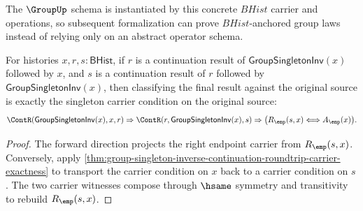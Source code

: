 The $\GroupUp$ schema is instantiated by this concrete $BHist$ carrier and
operations, so subsequent formalization can prove $BHist$-anchored group laws
instead of relying only on an abstract operator schema.

\begin{theorem}
\label{thm:group-singleton-inverse-continuation-roundtrip-source-iff}
For histories $x,r,s:\mathsf{BHist}$, if $r$ is a continuation result of
$\mathsf{GroupSingletonInv}(x)$ followed by $x$, and $s$ is a continuation
result of $r$ followed by $\mathsf{GroupSingletonInv}(x)$, then classifying the
final result against the original source is exactly the singleton carrier
condition on the original source:
$$
\ContR(\mathsf{GroupSingletonInv}(x),x,r)\Rightarrow
\ContR(r,\mathsf{GroupSingletonInv}(x),s)\Rightarrow
\bigl(R_{\emp}(s,x)\Longleftrightarrow A_{\emp}(x)\bigr).
$$
\end{theorem}
\begin{proof}
The forward direction projects the right endpoint carrier from
$R_{\emp}(s,x)$. Conversely, apply
\autoref{thm:group-singleton-inverse-continuation-roundtrip-carrier-exactness}
to transport the carrier condition on $x$ back to a carrier condition on $s$.
The two carrier witnesses compose through $\hsame$ symmetry and transitivity to
rebuild $R_{\emp}(s,x)$.
\end{proof}
